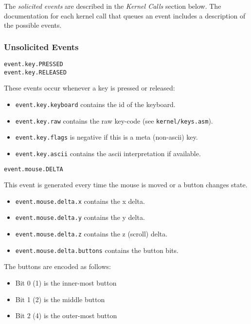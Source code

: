 The {\em solicited events} are described in the {\em Kernel Calls} section below.  The documentation for each kernel call that queues an event includes a description of the possible events.

\subsubsection*{Unsolicited Events}

\begin{verbatim}
event.key.PRESSED
event.key.RELEASED
\end{verbatim}

These events occur whenever a key is pressed or released:

\begin{itemize}
    \item \verb+event.key.keyboard+ contains the id of the keyboard.
    \item \verb+event.key.raw+ contains the raw key-code (see \verb+kernel/keys.asm+).
    \item \verb+event.key.flags+ is negative if this is a meta (non-ascii) key.
    \item \verb+event.key.ascii+ contains the ascii interpretation if available.
\end{itemize}

\begin{verbatim}
event.mouse.DELTA
\end{verbatim}

This event is generated every time the mouse is moved or a button changes state.

\begin{itemize}
\item \verb+event.mouse.delta.x+ contains the x delta.
\item \verb+event.mouse.delta.y+ contains the y delta.
\item \verb+event.mouse.delta.z+ contains the z (scroll) delta.
\item \verb+event.mouse.delta.buttons+ contains the button bits.
\end{itemize}

The buttons are encoded as follows:

\begin{itemize}
\item Bit 0 (1) is the inner-most button
\item Bit 1 (2) is the middle button
\item Bit 2 (4) is the outer-most button
\end{itemize}


